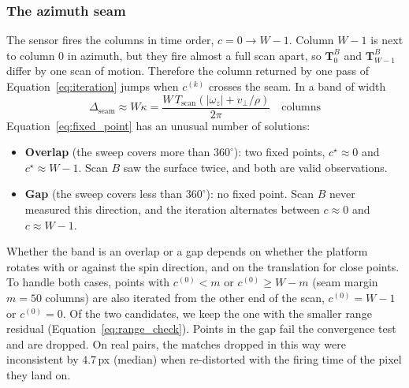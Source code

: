 \subsubsection{The azimuth seam}
The sensor fires the columns in time order, $c = 0 \rightarrow W-1$. Column $W-1$ is next to column $0$ in azimuth, but they fire almost a full scan apart, so $\mathbf{T}^{B}_{0}$ and $\mathbf{T}^{B}_{W-1}$ differ by one scan of motion. Therefore the column returned by one pass of Equation~\eqref{eq:iteration} jumps when $c^{(k)}$ crosses the seam. In a band of width
\begin{equation}
    \Delta_{\mathrm{seam}} \approx W\kappa = \frac{W\,T_{\mathrm{scan}}\left(|\omega_z| + v_{\perp}/\rho\right)}{2\pi} \quad \text{columns}
\end{equation}
Equation~\eqref{eq:fixed_point} has an unusual number of solutions:
\begin{itemize}
    \item \textbf{Overlap} (the sweep covers more than $360^{\circ}$): two fixed points, $c^{\star} \approx 0$ and $c^{\star} \approx W-1$. Scan $B$ saw the surface twice, and both are valid observations.
    \item \textbf{Gap} (the sweep covers less than $360^{\circ}$): no fixed point. Scan $B$ never measured this direction, and the iteration alternates between $c \approx 0$ and $c \approx W-1$.
\end{itemize}
Whether the band is an overlap or a gap depends on whether the platform rotates with or against the spin direction, and on the translation for close points. To handle both cases, points with $c^{(0)} < m$ or $c^{(0)} \ge W - m$ (seam margin $m = 50$ columns) are also iterated from the other end of the scan, $c^{(0)} = W-1$ or $c^{(0)} = 0$. Of the two candidates, we keep the one with the smaller range residual (Equation~\eqref{eq:range_check}). Points in the gap fail the convergence test and are dropped. On real pairs, the matches dropped in this way were inconsistent by $4.7$\,px (median) when re-distorted with the firing time of the pixel they land on.

